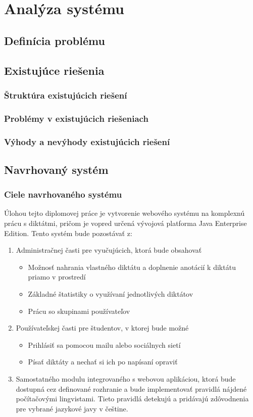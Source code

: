 \documentclass[12pt,oneside]{fithesis2}
\begin{document}
    \chapter{Analýza systému}
       \section{Definícia problému}
       \section{Existujúce riešenia}       
       		\subsection{Štruktúra existujúcich riešení}
       		\subsection{Problémy v existujúcich riešeniach}
       		\subsection{Výhody a nevýhody existujúcich riešení}
       \section{Navrhovaný systém}
       		\subsection{Ciele navrhovaného systému}
       		
Úlohou tejto diplomovej práce je vytvorenie webového systému na komplexnú prácu s diktátmi, pričom je vopred určená vývojová platforma Java Enterprise Edition. Tento systém bude pozostávať z:

\begin{enumerate}
\item Administračnej časti pre vyučujúcich, ktorá bude obsahovať
	\begin{itemize}
	\item Možnosť nahrania vlastného diktátu a doplnenie anotácií k diktátu priamo v prostredí
	\item Základné štatistiky o využívaní jednotlivých diktátov
	\item Prácu so skupinami používateľov
	\end{itemize}
\item Používateľskej časti pre študentov, v ktorej bude možné
	\begin{itemize}
	\item Prihlásiť sa pomocou mailu alebo sociálnych sietí
	\item Písať diktáty a nechať si ich po napísaní opraviť
	\end{itemize}
\item Samostatného modulu integrovaného s webovou aplikáciou, ktorá bude dostupná cez definované rozhranie a bude implementovať pravidlá nájdené počítačovými lingvistami. Tieto pravidlá detekujú a pridávajú zdôvodnenia pre vybrané jazykové javy v češtine.
\end{enumerate}
       		
\end{document}
